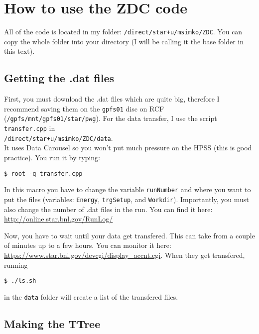 \section{How to use the ZDC code}\hypertarget{how-to-use-the-zdc-code}{}\label{how-to-use-the-zdc-code}

All of the code is located in my folder: \texttt{/direct/star+u/msimko/ZDC}. You can copy the whole folder into
your directory (I will be calling it the base folder in this text).

\subsection{Getting the .dat files}\hypertarget{getting-the-dat-files}{}\label{getting-the-dat-files}

First, you must download the .dat files which are quite big, therefore I recommend saving them on
the \texttt{gpfs01} disc on RCF (\texttt{/gpfs/mnt/gpfs01/star/pwg}). For the data transfer, I use the script
\texttt{transfer.cpp} in\\
\texttt{/direct/star+u/msimko/ZDC/data}.\\
It uses Data Carousel so you won't put much
pressure on the HPSS (this is good practice). You run it by typing:
\begin{verbatim}
$ root -q transfer.cpp
\end{verbatim}
In this macro you have to change the variable
\texttt{runNumber} and where you want to put the files (variables: \texttt{Energy}, \texttt{trgSetup}, 
and \texttt{Workdir}).
Importantly, you must also change the number of .dat files in the run. You can find it here:
\href{http://online.star.bnl.gov/RunLog/}{http://online.star.bnl.gov/RunLog/}

Now, you have to wait until your data get transfered. This can take from a couple of minutes up to a few hours.
You can monitor it here:
\url{https://www.star.bnl.gov/devcgi/display\_accnt.cgi}.
When they get transfered, running
\begin{verbatim}
$ ./ls.sh
\end{verbatim}
in the \texttt{data} folder will create a list of the transfered files.

\subsection{Making the TTree}\hypertarget{making-the-ttree}{}\label{making-the-ttree}

